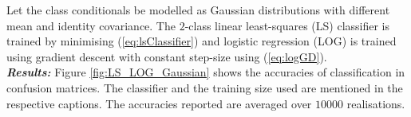 \documentclass[12pt, a4 paper]{article}
\begin{document}

\label{prob:1.c}

Let the class conditionals be modelled as Gaussian distributions with different mean and identity covariance. The $2$-class linear least-squares (LS) classifier is trained by minimising (\ref{eq:lsClassifier}) and logistic regression (LOG) is trained using gradient descent with constant step-size using (\ref{eq:logGD}). \\

{\it \bfseries Results:} Figure \ref{fig:LS_LOG_Gaussian} shows the accuracies of classification in confusion matrices. The classifier and the training size used are mentioned in the respective captions. The accuracies reported are averaged over $10000$ realisations. \\
\end{document}
